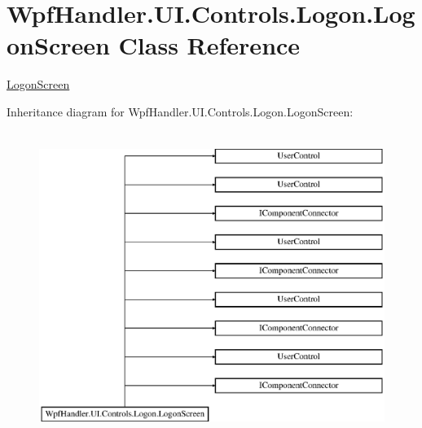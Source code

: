\hypertarget{class_wpf_handler_1_1_u_i_1_1_controls_1_1_logon_1_1_logon_screen}{}\section{Wpf\+Handler.\+U\+I.\+Controls.\+Logon.\+Logon\+Screen Class Reference}
\label{class_wpf_handler_1_1_u_i_1_1_controls_1_1_logon_1_1_logon_screen}


\mbox{\hyperlink{class_wpf_handler_1_1_u_i_1_1_controls_1_1_logon_1_1_logon_screen}{Logon\+Screen}}  


Inheritance diagram for Wpf\+Handler.\+U\+I.\+Controls.\+Logon.\+Logon\+Screen\+:\begin{figure}[H]
\begin{center}
\leavevmode
\includegraphics[height=10.000000cm]{d4/d25/class_wpf_handler_1_1_u_i_1_1_controls_1_1_logon_1_1_logon_screen}
\end{center}
\end{figure}
